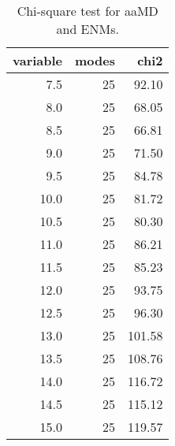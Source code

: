 \begin{table}[center]
\centering
\caption{Chi-square test for aaMD and ENMs.}
\label{tab:chi2}
\begin{tabular}{rrr}
\toprule
 variable &  modes &   chi2 \\
\midrule
      7.5 &     25 &  92.10 \\
      8.0 &     25 &  68.05 \\
      8.5 &     25 &  66.81 \\
      9.0 &     25 &  71.50 \\
      9.5 &     25 &  84.78 \\
     10.0 &     25 &  81.72 \\
     10.5 &     25 &  80.30 \\
     11.0 &     25 &  86.21 \\
     11.5 &     25 &  85.23 \\
     12.0 &     25 &  93.75 \\
     12.5 &     25 &  96.30 \\
     13.0 &     25 & 101.58 \\
     13.5 &     25 & 108.76 \\
     14.0 &     25 & 116.72 \\
     14.5 &     25 & 115.12 \\
     15.0 &     25 & 119.57 \\
\bottomrule
\end{tabular}
\end{table}

